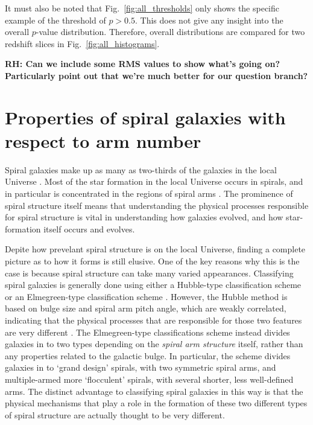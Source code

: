 \documentclass[useAMS,usenatbib]{mn2e}
\newcommand{\rh}[1]{{\bf \textcolor{RoyalPurple}{RH: #1}}}
\begin{document}
It must also be noted that Fig.~\ref{fig:all_thresholds} only shows the specific example of the threshold of $p>0.5$. This does not give any insight into the overall $p$-value distribution. Therefore, overall distributions are compared for two redshift slices in Fig.~\ref{fig:all_histograms}. 

\rh{Can we include some RMS values to show what's going on? Particularly point out that we're much better for our question branch?}


\section{Properties of spiral galaxies with respect to arm number}
\label{sec:results}

Spiral galaxies make up as many as two-thirds of the galaxies in the local Universe \citep{Lintott_11,Willett_13}. Most of the star formation in the local Universe occurs in spirals, and in particular is concentrated in the regions of spiral arms \citep{Dobbs_14}. The prominence of spiral structure itself means that understanding the physical processes responsible for spiral structure is vital in understanding how galaxies evolved, and how star-formation itself occurs and evolves.

Depite how prevelant spiral structure is on the local Universe, finding a complete picture as to how it forms is still elusive. One of the key reasons why this is the case is because spiral structure can take many varied appearances. Classifying spiral galaxies is generally done using either a Hubble-type classification scheme \citep{Hubble_26} or an Elmegreen-type classification scheme \citep{EE_82,EE_87}. However, the Hubble method is based on bulge size and spiral arm pitch angle, which are weakly correlated, indicating that the physical processes that are responsible for those two features are very different \citep{Kennicutt_81,Seigar_98}. The Elmegreen-type classifications scheme instead divides galaxies in to two types depending on the \emph{spiral arm structure} itself, rather than any properties related to the galactic bulge. In particular, the scheme divides galaxies in to `grand design' spirals, with two symmetric spiral arms, and multiple-armed more `flocculent' spirals, with several shorter, less well-defined arms. The distinct advantage to classifying spiral galaxies in this way is that the physical mechanisms that play a role in the formation of these two different types of spiral structure are actually thought to be very different.
\end{document}
